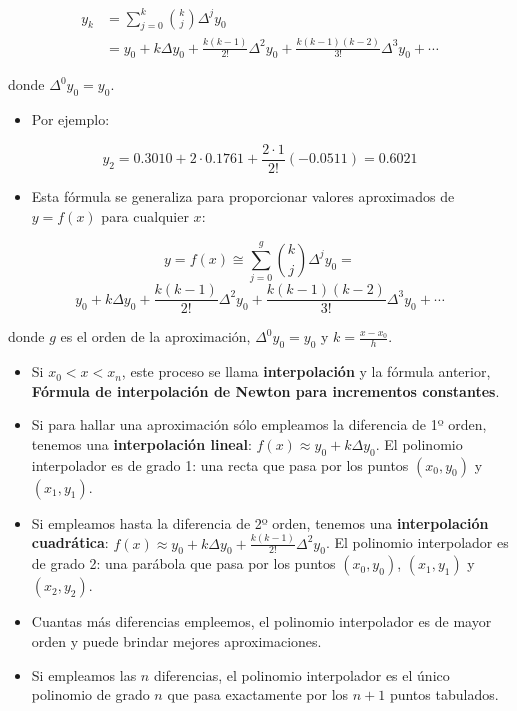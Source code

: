 \documentclass[openany]{book}
\providecommand{\tightlist}{%
  \setlength{\itemsep}{0pt}\setlength{\parskip}{0pt}}
\begin{document}
\[
\begin{aligned}
y_k & = \sum_{j=0}^k \binom{k}{j} \Delta^{j} y_0 \\
    & = y_0 + k \Delta y_0 + \frac{k(k-1)}{2!}\Delta^2 y_0 + \frac{k(k-1)(k-2)}{3!}\Delta^3 y_0 + \cdots 
\end{aligned}
\]

donde \(\Delta^{0} y_0 = y_0\).

\begin{itemize}
\tightlist
\item
  Por ejemplo:
\end{itemize}

\[
y_2 = 0.3010 + 2 \cdot 0.1761 + \frac{2\cdot 1}{2!} (-0.0511) = 0.6021
\]

\begin{itemize}
\tightlist
\item
  Esta fórmula se generaliza para proporcionar valores aproximados de \(y = f(x)\) para cualquier \(x\):
\end{itemize}

\[
y = f(x) \cong \sum_{j = 0}^{g} \binom{k}{j} \Delta^{j} y_0 = 
\]
\[
y_0 + k \Delta y_0 + \frac{k(k-1)}{2!}\Delta^2 y_0 + \frac{k(k-1)(k-2)}{3!}\Delta^3 y_0 + \cdots
\]

donde \(g\) es el orden de la aproximación, \(\Delta^{0} y_0 = y_0\) y \(k = \frac{x-x_0}{h}\).

\begin{itemize}
\item
  Si \(x_0 < x < x_n\), este proceso se llama \textbf{interpolación} y la fórmula anterior, \textbf{Fórmula de interpolación de Newton para incrementos constantes}.
\item
  Si para hallar una aproximación sólo empleamos la diferencia de 1º orden, tenemos una \textbf{interpolación lineal}: \(f(x) \approx y_0 + k \Delta y_0\). El polinomio interpolador es de grado 1: una recta que pasa por los puntos \((x_0, y_0)\) y \((x_1, y_1)\).
\item
  Si empleamos hasta la diferencia de 2º orden, tenemos una \textbf{interpolación cuadrática}: \(f(x) \approx y_0 + k \Delta y_0 + \frac{k(k-1)}{2!}\Delta^2 y_0\). El polinomio interpolador es de grado 2: una parábola que pasa por los puntos \((x_0, y_0)\), \((x_1, y_1)\) y \((x_2, y_2)\).
\item
  Cuantas más diferencias empleemos, el polinomio interpolador es de mayor orden y puede brindar mejores aproximaciones.
\item
  Si empleamos las \(n\) diferencias, el polinomio interpolador es el único polinomio de grado \(n\) que pasa exactamente por los \(n + 1\) puntos tabulados.
\end{itemize}
\end{document}
